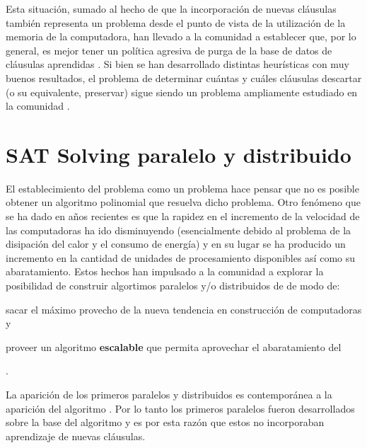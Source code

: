 Esta situación, sumado al hecho de que la incorporación de
nuevas cláusulas también representa un problema desde el punto de vista de la
utilización de la memoria de la computadora, han llevado a la comunidad a
establecer que, por lo general, es mejor tener un política agresiva de purga
de la base de datos de cláusulas aprendidas
\cite{Audemard:2009:PLC:1661445.1661509}. Si bien se han desarrollado
distintas heurísticas con muy buenos resultados, el problema de determinar
cuántas y cuáles cláusulas descartar (o su equivalente, preservar) sigue
siendo un problema ampliamente estudiado en la comunidad \sat.


\section{SAT Solving paralelo y distribuido}

El establecimiento del problema \sat como un problema \npc hace pensar que no
es posible obtener un algoritmo polinomial que resuelva dicho problema. Otro
fenómeno que se ha dado en años recientes es que la rapidez en el incremento
de la velocidad de las computadoras ha ido disminuyendo (esencialmente debido
al problema de la disipación del calor y el consumo de energía)
 y en su
lugar se ha producido un incremento en la cantidad de unidades de
procesamiento disponibles así como su abaratamiento. Estos hechos han
impulsado a la comunidad \sat a explorar la posibilidad de construir
algortimos paralelos y/o distribuidos de \ssolving de modo de:
\begin{inparaenum}[a)]  \item sacar el máximo provecho de la nueva tendencia
en construcción de computadoras y  \item proveer un algoritmo
\textbf{escalable} que permita aprovechar el abaratamiento del \hard
\end{inparaenum}.

La aparición de los primeros \ssolvers paralelos y distribuidos
\cite{bohm:1996:afast, zhang:jsc-1996} es contemporánea a la aparición del
algoritmo \CDCL. Por lo tanto los primeros \ssolvers paralelos fueron
desarrollados sobre la base del algoritmo \dpll y es por esta razón que estos
\ssolvers no incorporaban aprendizaje de nuevas cláusulas.

